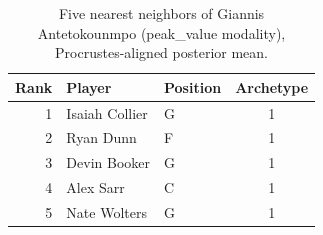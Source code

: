 \begin{table}[htbp]
  \centering\small
  \begin{tabular}{rllc}
    \toprule
    Rank & Player & Position & Archetype \\
    \midrule
    1 & Isaiah Collier & G & 1 \\
    2 & Ryan Dunn & F & 1 \\
    3 & Devin Booker & G & 1 \\
    4 & Alex Sarr & C & 1 \\
    5 & Nate Wolters & G & 1 \\
    \bottomrule
  \end{tabular}
  \caption{Five nearest neighbors of Giannis Antetokounmpo (peak_value modality), Procrustes-aligned posterior mean.}
  \label{tab:Giannis_Antetokounmpo_neighbors_peak_value}
\end{table}

